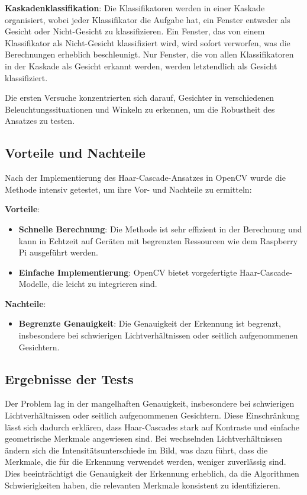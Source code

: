 \textbf{Kaskadenklassifikation}: Die Klassifikatoren werden in einer Kaskade organisiert, wobei jeder Klassifikator die Aufgabe hat, ein Fenster entweder als Gesicht oder Nicht-Gesicht zu klassifizieren. Ein Fenster, das von einem Klassifikator als Nicht-Gesicht klassifiziert wird, wird sofort verworfen, was die Berechnungen erheblich beschleunigt. Nur Fenster, die von allen Klassifikatoren in der Kaskade als Gesicht erkannt werden, werden letztendlich als Gesicht klassifiziert.

Die ersten Versuche konzentrierten sich darauf, Gesichter in verschiedenen Beleuchtungssituationen und Winkeln zu erkennen, um die Robustheit des Ansatzes zu testen.


\subsection{Vorteile und Nachteile}
Nach der Implementierung des Haar-Cascade-Ansatzes in OpenCV wurde die Methode intensiv getestet, um ihre Vor- und Nachteile zu ermitteln:

\textbf{Vorteile}:
\begin{itemize}
    \item \textbf{Schnelle Berechnung}: Die Methode ist sehr effizient in der Berechnung und kann in Echtzeit auf Geräten mit begrenzten Ressourcen wie dem Raspberry Pi ausgeführt werden.
    \item \textbf{Einfache Implementierung}: OpenCV bietet vorgefertigte Haar-Cascade-Modelle, die leicht zu integrieren sind.
\end{itemize}

\textbf{Nachteile}:
\begin{itemize}
    \item \textbf{Begrenzte Genauigkeit}: Die Genauigkeit der Erkennung ist begrenzt, insbesondere bei schwierigen Lichtverhältnissen oder seitlich aufgenommenen Gesichtern.
\end{itemize}

\subsection{Ergebnisse der Tests}

 Der Problem lag in der mangelhaften Genauigkeit, insbesondere bei schwierigen Lichtverhältnissen oder seitlich aufgenommenen Gesichtern. Diese Einschränkung lässt sich dadurch erklären, dass Haar-Cascades stark auf Kontraste und einfache geometrische Merkmale angewiesen sind. Bei wechselnden Lichtverhältnissen ändern sich die Intensitätsunterschiede im Bild, was dazu führt, dass die Merkmale, die für die Erkennung verwendet werden, weniger zuverlässig sind. Dies beeinträchtigt die Genauigkeit der Erkennung erheblich, da die Algorithmen Schwierigkeiten haben, die relevanten Merkmale konsistent zu identifizieren.

